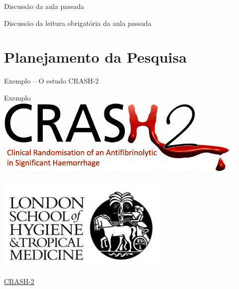 \documentclass{beamer}
\begin{document}

\begin{frame}{Discussão da aula passada}
  \begin{block}{}
    Discussão da leitura obrigatória da aula passada
  \end{block}
\end{frame}

\section{Planejamento da Pesquisa}

\begin{frame}[label=crash2-logo]{Exemplo -- O estudo CRASH-2}
  \begin{exampleblock}{Exemplo}
    \centering
    \includegraphics[width=.8\textwidth]{Planejamento/C2logoNew}

    \bigskip
    \includegraphics[width=.4\textwidth]{Planejamento/Lshtm_newlogo}
  \end{exampleblock}
  \vfill
  \scriptsize
  \hfill \href{http://www.crash2.lshtm.ac.uk/}{CRASH-2}
\end{frame}
\end{document}
